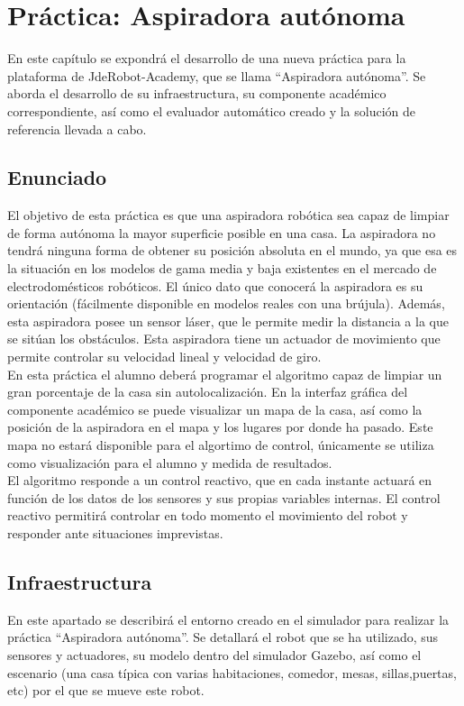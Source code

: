 \chapter{Práctica: Aspiradora autónoma}\label{cap.roomba}
En este capítulo se expondrá el desarrollo de una nueva práctica para la plataforma de JdeRobot-Academy, que se llama ``Aspiradora autónoma''. Se aborda el desarrollo de su infraestructura, su componente académico correspondiente, así como el evaluador automático creado y la solución de referencia llevada a cabo. 

\section{Enunciado} \label{sec.enunciado}
El objetivo de esta práctica es que una aspiradora robótica sea capaz de limpiar de forma autónoma la mayor superficie posible en una casa. La aspiradora no tendrá ninguna forma de obtener su posición absoluta en el mundo, ya que esa es la situación en los modelos
de gama media y baja existentes en el mercado de electrodomésticos robóticos. El único dato que conocerá la aspiradora es su orientación (fácilmente disponible en modelos reales con una brújula). Además, esta aspiradora posee un sensor láser, que le permite medir la distancia a la que se sitúan los obstáculos. Esta aspiradora tiene un actuador de movimiento que permite controlar su velocidad lineal y velocidad de giro.\\

En esta práctica el alumno deberá programar el algoritmo capaz de limpiar un gran porcentaje de la casa sin autolocalización. En la interfaz gráfica del componente académico se puede visualizar un mapa de la casa, así como la posición de la aspiradora en el mapa y los lugares por donde ha pasado. Este mapa no estará disponible para el algortimo de control, únicamente se utiliza como visualización para el alumno y medida de resultados.  \\

El algoritmo responde a un control reactivo, que en cada instante actuará en función de los datos de los sensores y sus propias variables internas. El control reactivo permitirá controlar en todo momento el movimiento del robot y responder ante situaciones imprevistas.

\section{Infraestructura}
En este apartado se describirá el entorno creado en el simulador para realizar la práctica ``Aspiradora autónoma''. Se detallará el robot que se ha utilizado, sus sensores y actuadores, su modelo dentro del simulador Gazebo, así como el escenario (una casa típica con varias habitaciones, comedor, mesas, sillas,puertas, etc) por el que se mueve este robot. 

